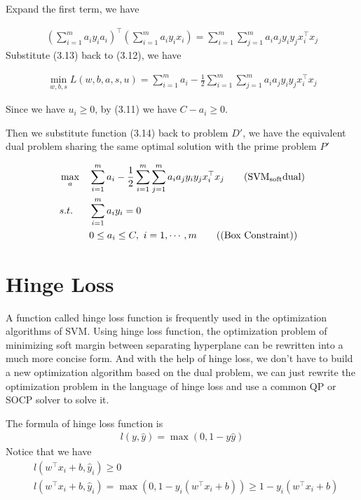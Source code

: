 \documentclass[a4paper]{report}
\begin{document}
Expand the first term, we have 

\begin{align}
    \left( \sum_{i=1}^m a_i y_i a_i \right)^\top \left( \sum_{i=1}^m a_i y_i x_i\right)= \sum_{i=1}^m\sum_{j=1}^m a_i a_j y_i y_j x_i^\top x_j
\end{align}
Substitute (3.13) back to (3.12), we have

\begin{align}
    \min_{w,b,s} L(w,b,a,s,u) = \sum_{i=1}^m a_i - \frac{1}{2} \sum_{i=1}^m\sum_{j=1}^m a_i a_j y_i y_j x_i^\top x_j
\end{align}

Since we have $u_i\geq 0$, by (3.11) we have $C-a_i\geq 0$.

Then we substitute function (3.14) back to problem $D'$, we have the equivalent dual problem sharing the same optimal solution with the prime problem $P'$

\begin{align*}
    &\max_a & & \sum_{i=1}^m a_i - \frac{1}{2} \sum_{i=1}^m\sum_{j=1}^m a_i a_j y_i y_j x_i^\top x_j \label{softsvmd}\tag{$\mathrm{SVM_{soft} dual}$}\\
    &s.t. \ & & \sum_{i=1}^m a_i y_i=0 \\
    & & & 0\leq a_i \leq C,\ i=1,\cdots,m \tag{(Box Constraint)}
\end{align*}

\section{Hinge Loss}

A function called hinge loss function is frequently used in the optimization algorithms of SVM. Using hinge loss function, the optimization problem of minimizing soft margin between separating hyperplane can be rewritten into a much more concise form. And with the help of hinge loss, we don't have to build a new optimization algorithm based on the dual problem, we can just rewrite the optimization problem in the language of hinge loss and use a common QP or SOCP solver to solve it.

The formula of hinge loss function is
\begin{align}
    l(y,\hat y)=\max(0,1-y\hat y)
\end{align}
Notice that we have
\begin{align}
    &l(w^\top x_i+b,\hat y_i) \geq 0 \\
    &l(w^\top x_i+b,\hat y_i) =\max(0,1-y_i(w^\top x_i+b))\geq 1-y_i(w^\top x_i+b)
\end{align}
\end{document}
